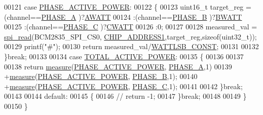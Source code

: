 \begin{DoxyCode}
00121                 \textcolor{keywordflow}{case}  \hyperlink{a00043_abd3f95c7cd63d0627552d293bf49e026}{PHASE\_ACTIVE\_POWER}:
00122                 \{
00123                     uint16\_t target\_reg =    (channel==\hyperlink{a00043_ad214039f52b011ce2bd6c85ff98a981b}{PHASE\_A} )?\hyperlink{a00036_a70d4c8c1577490f1b69cfab591458142}{AWATT}
00124                                             :(channel==\hyperlink{a00043_ad7b96feed1e1c12515dad5e926b2c62e}{PHASE\_B} )?\hyperlink{a00036_a3a60995ae993fd06892df7023a9f496c}{BWATT}
00125                                             :(channel==\hyperlink{a00043_a3ceb83fb10c2af19b468d508448f24e2}{PHASE\_C} )?\hyperlink{a00036_aeb58aae2f3e0c16a12cf4b6b03d6c5d9}{CWATT}
00126                                             :0;         
00127                                           
00128                     measured\_val = \hyperlink{a00007_ga7ad9f65ee46aca507374096506a0b1c4}{spi\_read}(BCM2835\_SPI\_CS0,
      \hyperlink{a00037_a94de2b046db6e10257ef4481c0a15eaa}{CHIP\_ADDRESS1},target\_reg,\textcolor{keyword}{sizeof}(uint32\_t));
00129                     printf(\textcolor{stringliteral}{"#"});
00130                     \textcolor{keywordflow}{return} measured\_val/\hyperlink{a00037_a218dca2818f6fa6923467998b967a084}{WATTLSB\_CONST};
00131                     
00132                 \}\textcolor{keywordflow}{break};
00133                 
00134                 \textcolor{keywordflow}{case}  \hyperlink{a00043_a7d0d4057be5aaf168a22ee4379e6ff30}{TOTAL\_ACTIVE\_POWER}:
00135                 \{
00136                 
00137                             
00138                      \textcolor{keywordflow}{return} \hyperlink{a00009_gac914ebaa64afce03ee852af09659cf69}{measure}(\hyperlink{a00043_abd3f95c7cd63d0627552d293bf49e026}{PHASE\_ACTIVE\_POWER},
      \hyperlink{a00043_ad214039f52b011ce2bd6c85ff98a981b}{PHASE\_A},1)
00139                             +\hyperlink{a00009_gac914ebaa64afce03ee852af09659cf69}{measure}(\hyperlink{a00043_abd3f95c7cd63d0627552d293bf49e026}{PHASE\_ACTIVE\_POWER},
      \hyperlink{a00043_ad7b96feed1e1c12515dad5e926b2c62e}{PHASE\_B},1);
00140                             +\hyperlink{a00009_gac914ebaa64afce03ee852af09659cf69}{measure}(\hyperlink{a00043_abd3f95c7cd63d0627552d293bf49e026}{PHASE\_ACTIVE\_POWER},
      \hyperlink{a00043_a3ceb83fb10c2af19b468d508448f24e2}{PHASE\_C},1);
00141                     
00142                 \}\textcolor{keywordflow}{break};
00143                 
00144                 \textcolor{keywordflow}{default}:
00145                 \{    
00146                   \textcolor{comment}{// return -1;}
00147                 \}\textcolor{keywordflow}{break};
00148      
00149         \}
00150 \}
\end{DoxyCode}


